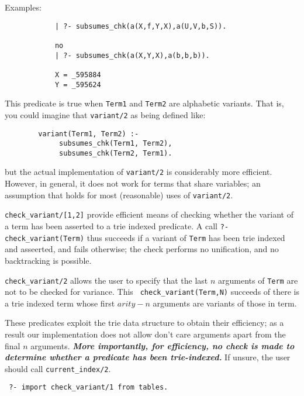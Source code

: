 \begin{description}
    Examples:
    {\footnotesize
     \begin{verbatim}
            | ?- subsumes_chk(a(X,f,Y,X),a(U,V,b,S)).

            no
            | ?- subsumes_chk(a(X,Y,X),a(b,b,b)).

            X = _595884
            Y = _595624
     \end{verbatim}}

    This predicate is true when {\tt Term1} and {\tt Term2} are 
    alphabetic variants.  That is, you could imagine that {\tt variant/2}
    as being defined like:
    \begin{center}
    \begin{minipage}{3.5in}
    \begin{verbatim}
        variant(Term1, Term2) :-
             subsumes_chk(Term1, Term2),
             subsumes_chk(Term2, Term1).
    \end{verbatim}
    \end{minipage}
    \end{center}
    but the actual implementation of {\tt variant/2} is considerably more
    efficient.  However, in general, it does not work for terms that share
    variables; an assumption that holds for most (reasonable) uses of
    {\tt variant/2}.

%
 {\tt check\_variant/[1,2]} provide efficient means of checking
 whether the variant of a term has been asserted to a trie indexed
 predicate.  A call {\tt ?- check\_variant(Term)} thus succeeds if a
 variant of {\tt Term} has been trie indexed and asseerted, and fails
 otherwise; the check performs no unification, and no backtracking is
 possible.

{\tt check\_variant/2} allows the user to specify that the last $n$
arguments of {\tt Term} are not to be checked for variance.  This {\tt
  check\_variant(Term,N)} succeeds of there is a trie indexed term
whose first $arity - n$ arguments are variants of those in term.

These predicates exploit the trie data structure to obtain their
efficiency; as a result our implementation does not allow don't care
arguments apart from the final $n$ arguments.  {\bf {\em More
    importantly, for efficiency, no check is made to determine whether
    a predicate has been trie-indexed.}}  If unsure, the user should
call {\tt current\_index/2}.
%
\begin{example}
\begin{small}
\begin{verbatim}
 ?- import check_variant/1 from tables.


\end{verbatim}
\end{small}
\end{example}
\end{description}
